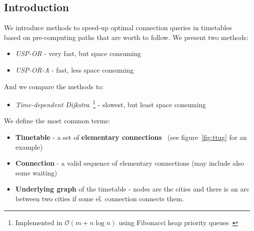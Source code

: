 \documentclass[myposter,portrait]{sciposter}
\def\mysection#1{
{\color{sectionCol}\section*{\sc\bfseries #1}}}
\begin{document}
\begin{multicols*}{3}

\mysection{Introduction}

	We introduce methods to speed-up optimal connection queries in timetables based on pre-computing paths that are worth to follow. We present two methods:
	\begin{itemize}
		\item \textit{USP-OR} - very fast, but space consuming
		\item \textit{USP-OR-A} - fast, less space consuming
	\end{itemize}
	And we compare the methods to:
	\begin{itemize}
		\item \textit{Time-dependent Dijkstra}~\footnote{Implemented in $\mathcal{O}(m + n \log n)$ using Fibonacci heap priority queues~\cite{sommerthesis10}} - slowest, but least space consuming
	\end{itemize}
	\hspace{\fill}
	
	We define the most common terms:
	\begin{itemize}
		\item \textbf{Timetable} - a set of \textbf{elementary connections}~\cite{timetablemodelsalgs07} (see figure~\ref{fig:ttug} for an example)
		\item \textbf{Connection} - a valid sequence of elementary connections (may include also some waiting)
		\item \textbf{Underlying graph} of the timetable - nodes are the cities and there is an arc between two cities if some el. connection connects them.
	\end{itemize}


\end{multicols*}
\end{document}
